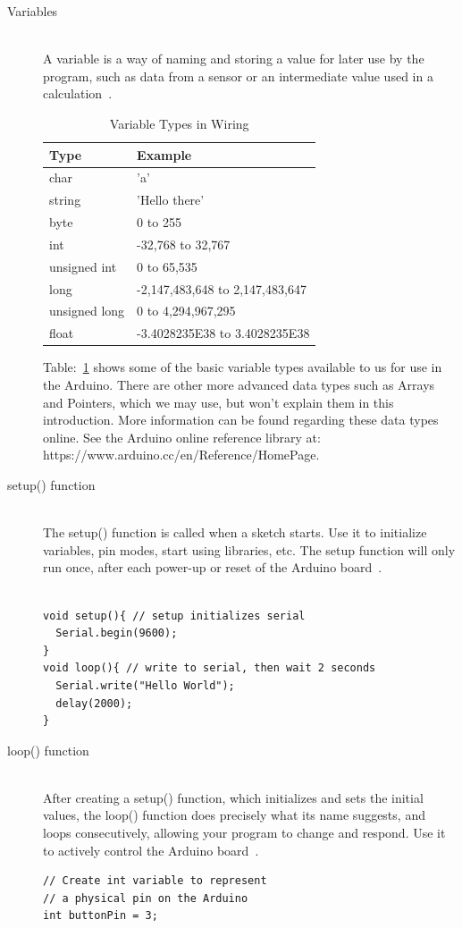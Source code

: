 \begin{description}
	\item[Variables] \hfill \\
	A variable is a way of naming and storing a value for later use by the program, such as data from a sensor or an intermediate value used in a calculation~\citep{arduino-15-b}.
	\begin{table}
		\centering
		\begin{tabular}{p{4cm} l}
			\toprule
			Type & Example\\ \midrule
			char & 'a' \\
			string & 'Hello there' \\
			byte & 0 to 255 \\
			int & -32,768 to 32,767 \\
			unsigned int & 0 to 65,535 \\
			long & -2,147,483,648 to 2,147,483,647 \\
			unsigned long & 0 to 4,294,967,295 \\
			float & -3.4028235E38 to 3.4028235E38 \\
			\bottomrule
		\end{tabular}
		\caption{Variable Types in Wiring}
		\label{tab:wiring_variable_types}
	\end{table}
	Table:~\ref{tab:wiring_variable_types} shows some of the basic variable types available to us for use in the Arduino. There are other more advanced data types such as Arrays and Pointers, which we may use, but won't explain them in this introduction. More information can be found regarding these data types online. See the Arduino online reference library at: https://www.arduino.cc/en/Reference/HomePage.
	
	\item[setup() function] \hfill \\
	The setup() function is called when a sketch starts. Use it to initialize variables, pin modes, start using libraries, etc. The setup function will only run once, after each power-up or reset of the Arduino board~\citep{arduino-15-c}.
	\begin{lstlisting}

void setup(){ // setup initializes serial
  Serial.begin(9600);
}
void loop(){ // write to serial, then wait 2 seconds
  Serial.write("Hello World");
  delay(2000);
}
	\end{lstlisting}

\newpage	
	\item[loop() function] \hfill \\
	After creating a setup() function, which initializes and sets the initial values, the loop() function does precisely what its name suggests, and loops consecutively, allowing your program to change and respond. Use it to actively control the Arduino board~\citep{arduino-15-d}.
	\begin{lstlisting}
// Create int variable to represent
// a physical pin on the Arduino
int buttonPin = 3;


\end{lstlisting}
\end{description}
